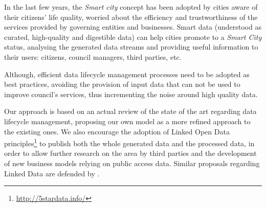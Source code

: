 In the last few years, the \textit{Smart city} concept has been adopted by cities aware of their citizens' life quality, worried about the efficiency and trustworthiness of the services provided by governing entities and businesses. Smart data (understood as curated, high-quality and digestible data) can help cities promote to a \textit{Smart City} status, analysing the generated data streams and providing useful information to their users: citizens, council managers, third parties, etc.

Although, efficient data lifecycle management processes need to be a\-dop\-ted as best practices, avoiding the provision of input data that can not be used to improve council's services, thus incrementing the noise around high quality data.

Our approach is based on an actual review of the state of the art regarding data lifecycle management, proposing our own model as a more refined approach to the existing ones. We also encourage the adoption of Linked Open Data principles\footnote{\url{http://5stardata.info/}} to publish both the whole generated data and the processed data, in order to allow further research on the area by third parties and the development of new business models relying on public access data. Similar proposals regarding Linked Data are defended by \cite{Bizer:2012:MUB:2094114.2094129}.
